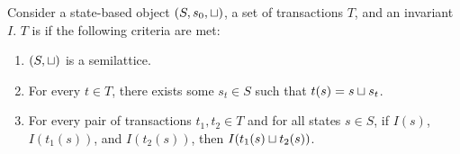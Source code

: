 \begin{claim}
  Consider a state-based object $(S, s_0, \sqcup)$, a set of transactions $T$,
  and an invariant $I$. $T$ is \Iconfluent{} if the following criteria are met:
  \begin{enumerate}
    \item
      $(S, \sqcup)$ is a semilattice.

    \item
      For every $t \in T$, there exists some $s_t \in S$ such that $t(s) = s
      \sqcup s_t$.

    \item
      For every pair of transactions $t_1, t_2 \in T$ and for all states $s \in
      S$, if $I(s)$, $I(t_1(s))$, and $I(t_2(s))$, then $I(t_1(s) \sqcup
      t_2(s))$.
  \end{enumerate}
\end{claim}
